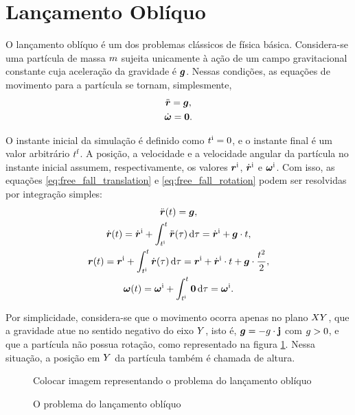 \section{Lançamento Oblíquo}

O lançamento oblíquo é um dos problemas clássicos de física básica. Considera-se uma partícula de massa \(m\) sujeita unicamente à ação de um campo gravitacional constante cuja aceleração da gravidade é \(\bm{g}\). Nessas condições, as equações de movimento para a partícula se tornam, simplesmente,
\begin{gather}
	\acceleration = \gravity, \label{eq:free_fall_translation}\\
	\angularAcceleration = \nullVector \label{eq:free_fall_rotation}.
\end{gather}

O instante inicial da simulação é definido como \(t^{\text{i}}=0\), e o instante final é um valor arbitrário \(t^{\text{f}}\). A posição, a velocidade e a velocidade angular da partícula no instante inicial assumem, respectivamente, os valores \(\bm{r}^{\text{i}}\), \(\initial{\velocity}\) e \(\bm{\omega}^{\text{i}}\). Com isso, as equações \eqref{eq:free_fall_translation} e \eqref{eq:free_fall_rotation} podem ser resolvidas por integração simples:
\begin{gather*}
	\acceleration\pqty{t} = \gravity, \\
	\velocity\pqty{t} = \initial{\velocity} + \int_{\initial{t}}^{t} \acceleration\pqty{\tau} \dd{\tau} = \initial{\velocity} + \gravity\cdot t, \\
	\position\pqty{t} = \initial{\position} + \int_{\initial{t}}^{t} \velocity\pqty{\tau} \dd{\tau} = \initial{\position} + \initial{\velocity}\cdot t + \gravity\cdot \dfrac{t^2}{2}, \\
	\angularVelocity\pqty{t} = \initial{\angularVelocity} + \int_{\initial{t}}^{t} \nullVector \dd{\tau} = \initial{\angularVelocity}.
\end{gather*}

Por simplicidade, considera-se que o movimento ocorra apenas no plano \(XY\), que a gravidade atue no sentido negativo do eixo \(Y\), isto é, \(\bm{g} = -g\cdot\mathbf{j}\) com \(g>0\), e que a partícula não possua rotação, como representado na figura \ref{fig:free_fall}. Nessa situação, a posição em \(Y\) da partícula também é chamada de altura.

\begin{figure}[h]
	\caption{O problema do lançamento oblíquo}
	\begin{center}
		\alert{Colocar imagem representando o problema do lançamento oblíquo}
	\end{center}
	\label{fig:free_fall}
\end{figure}

